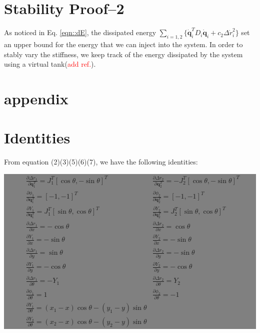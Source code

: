 \documentclass[]{article}
\begin{document}
\section{Stability Proof--2}
As noticed in Eq. \ref{eqn::dE}, the dissipated energy $\sum\limits_{i=1,2}\{\mathbf{\dot{q}}_i^TD_i\mathbf{\dot{q}}_i+c_2\Delta \dot{r}_i^2\}$ set an upper bound for the energy that we can inject into the system. In order to stably vary the stiffness, we keep track of the energy dissipated by the system using a virtual tank(\textcolor{red}{add ref.}). 

\section{appendix}
\appendix
\section{Identities}
\label{sec::app1}
From equation (2)(3)(5)(6)(7), we have the following identities:

\colorbox{gray}{
\begin{minipage}{10cm}
 \begin{align*}
 &\frac{\partial \Delta r_1}{\partial \mathbf{q}_1^T}=J_{1}^T\left[\cos\theta,-\sin\theta\right]^T 
 &\frac{\partial \Delta r_2}{\partial \mathbf{q}_2^T}=-J_{2}^T\left[\cos\theta,-\sin\theta\right]^T\nonumber\\
 &\frac{\partial \phi_1}{\partial \mathbf{q}_1^T}=[-1,-1]^T
 &\frac{\partial \phi_2}{\partial \mathbf{q}_2^T}=[-1,-1]^T\nonumber\\
 &\frac{\partial Y_1}{\partial\mathbf{q}_1^T}=J_1^T[\sin\theta,\cos\theta]^T
 &\frac{\partial Y_2}{\partial \mathbf{q}_2^T}=J_2^T[\sin\theta,\cos\theta]^T\nonumber\\
 &\frac{\partial \Delta r_1}{\partial x}=-\cos\theta
 &\frac{\partial \Delta r_2}{\partial x}=\cos\theta \nonumber\\
 &\frac{\partial Y_1}{\partial x}=-\sin\theta 
 &\frac{\partial Y_2}{\partial x}=-\sin\theta \nonumber\\
 &\frac{\partial \Delta r_1}{\partial y}=\sin\theta&\frac{\partial \Delta r_2}{\partial y}=-\sin\theta \nonumber\\
  &\frac{\partial Y_1}{\partial y}=-\cos\theta &\frac{\partial Y_2}{\partial y}=-\cos\theta \nonumber\\
  &\frac{\partial \Delta r_1}{\partial \theta}=-Y_1&\frac{\partial \Delta r_2}{\partial \theta}=Y_2\nonumber\\
  &\frac{\partial \phi_1}{\partial \theta}=1&\frac{\partial \phi_2}{\partial \theta}=-1\nonumber\\
  &\frac{\partial Y_1}{\partial \theta}=(x_1-x)\cos\theta-(y_1-y)\sin\theta&\\
  &\frac{\partial Y_2}{\partial \theta}=(x_2-x)\cos\theta-(y_2-y)\sin\theta&\nonumber
 \end{align*}
\end{minipage}}
\end{document}
